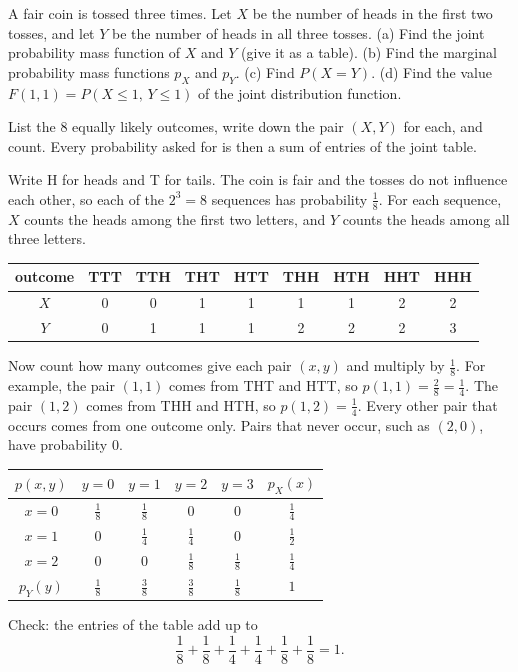 
\begin{problem}
	A fair coin is tossed three times. Let $X$ be the number of heads in the
	first two tosses, and let $Y$ be the number of heads in all three tosses.
	(a) Find the joint probability mass function of $X$ and $Y$ (give it as a
	table).
	(b) Find the marginal probability mass functions $p_X$ and $p_Y$.
	(c) Find $P(X=Y)$.
	(d) Find the value $F(1,1)=P(X\le1,\,Y\le1)$ of the joint distribution
	function.
\end{problem}

\begin{solution}
	\idea List the $8$ equally likely outcomes, write down the pair $(X,Y)$ for
	each, and count. Every probability asked for is then a sum of entries of
	the joint table.

	 Write H for heads and T for tails. The coin is fair and the
	tosses do not influence each other, so each of the $2^3=8$ sequences has
	probability $\frac18$. For each sequence, $X$ counts the heads among the
	first two letters, and $Y$ counts the heads among all three letters.
	\begin{center}
		\begin{tabular}{c|cccccccc}
			outcome & TTT & TTH & THT & HTT & THH & HTH & HHT & HHH \\ \hline
			$X$     & 0   & 0   & 1   & 1   & 1   & 1   & 2   & 2   \\
			$Y$     & 0   & 1   & 1   & 1   & 2   & 2   & 2   & 3
		\end{tabular}
	\end{center}
	Now count how many outcomes give each pair $(x,y)$ and multiply by
	$\frac18$. For example, the pair $(1,1)$ comes from THT and HTT, so
	$p(1,1)=\frac28=\frac14$. The pair $(1,2)$ comes from THH and HTH, so
	$p(1,2)=\frac14$. Every other pair that occurs comes from one outcome only.
	Pairs that never occur, such as $(2,0)$, have probability $0$.
	\begin{center}
		\renewcommand{\arraystretch}{1.4}
		\begin{tabular}{c|cccc|c}
			$p(x,y)$       & $y=0$          & $y=1$          & $y=2$          & $y=3$          & $p_X(x)$       \\ \hline
			$x=0$          & $\tfrac18$     & $\tfrac18$     & $0$            & $0$            & $\tfrac14$     \\
			$x=1$          & $0$            & $\tfrac14$     & $\tfrac14$     & $0$            & $\tfrac12$     \\
			$x=2$          & $0$            & $0$            & $\tfrac18$     & $\tfrac18$     & $\tfrac14$     \\ \hline
			$p_Y(y)$       & $\tfrac18$     & $\tfrac38$     & $\tfrac38$     & $\tfrac18$     & $1$
		\end{tabular}
	\end{center}
	Check: the entries of the table add up to
	\[ \frac18+\frac18+\frac14+\frac14+\frac18+\frac18=1. \]


\end{solution}
